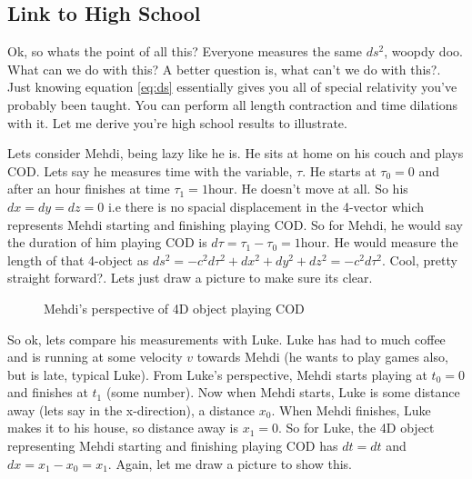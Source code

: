 \subsection{Link to High School}

Ok, so whats the point of all this? Everyone measures the same $ds^2$, woopdy doo. What can we do with this? A better question is, what can't we do with this?. Just knowing equation \eqref{eq:ds} essentially gives you all of special relativity you've probably been taught. You can perform all length contraction and time dilations with it. Let me derive you're high school results to illustrate. 

Lets consider Mehdi, being lazy like he is. He sits at home on his couch and plays COD. Lets say he measures time with the variable, $\tau$. He starts at $\tau_0 = 0$ and after an hour finishes at time $\tau_1 = 1$hour. He doesn't move at all. So his $dx = dy = dz =0$ i.e there is no spacial displacement in the 4-vector which represents Mehdi starting and finishing playing COD. So for Mehdi, he would say the duration of him playing COD is $d\tau = \tau_1 - \tau_0 = 1$hour. He would measure the length of that 4-object as $ds^2 = - c^2 d\tau^2 + dx^2 + dy^2 + dz^2 = -c^2 d\tau^2$. Cool, pretty straight forward?. Lets just draw a picture to make sure its clear. 

\begin{figure}[h]
  \centering
{}
\caption{Mehdi's perspective of 4D object playing COD}
\label{fig:M4d}
\end{figure}

So ok, lets compare his measurements with Luke. Luke has had to much coffee and is running at some velocity $v$ towards Mehdi (he wants to play games also, but is late, typical Luke). From Luke's perspective, Mehdi starts playing at $t_0 = 0$ and finishes at $t_1$ (some number). Now when Mehdi starts, Luke is some distance away (lets say in the x-direction), a distance $x_0$. When Mehdi finishes, Luke makes it to his house, so distance away is $x_1 =0$. So for Luke, the 4D object representing Mehdi starting and finishing playing COD has $dt = dt$ and $dx = x_1 - x_0 = x_1$. Again, let me draw a picture to show this. 

